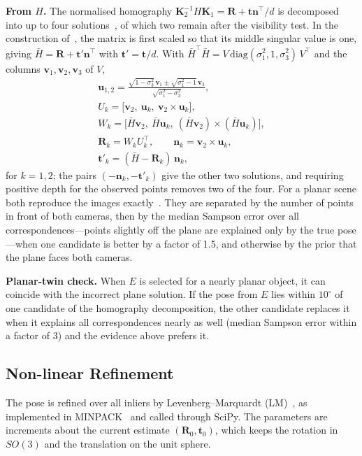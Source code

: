 \documentclass[10pt,a4paper,twocolumn]{article}
\newcommand{\R}{\mathbf{R}}
\newcommand{\tv}{\mathbf{t}}
\newcommand{\K}{\mathbf{K}}
\newcommand{\n}{\mathbf{n}}
\begin{document}
\textbf{From $H$.} The normalised homography $\K_2^{-1}H\K_1=\R+\tv\n^\top/d$ is decomposed into up to four solutions~\cite{malis}, of which two remain after the visibility test. In the construction of~\cite{ma2004}, the matrix is first scaled so that its middle singular value is one, giving $\bar H=\R+\tv'\n^\top$ with $\tv'=\tv/d$. With $\bar H^\top\bar H=V\,\mathrm{diag}(\sigma_1^2,1,\sigma_3^2)\,V^\top$ and the columns $\mathbf{v}_1,\mathbf{v}_2,\mathbf{v}_3$ of $V$,
\begin{gather}
  \mathbf{u}_{1,2}=\frac{\sqrt{1-\sigma_3^2}\,\mathbf{v}_1\pm\sqrt{\sigma_1^2-1}\,\mathbf{v}_3}{\sqrt{\sigma_1^2-\sigma_3^2}},\\
  U_k=\big[\mathbf{v}_2,\ \mathbf{u}_k,\ \mathbf{v}_2\times\mathbf{u}_k\big],\\
  W_k=\big[\bar H\mathbf{v}_2,\ \bar H\mathbf{u}_k,\ (\bar H\mathbf{v}_2)\times(\bar H\mathbf{u}_k)\big],\\
  \R_k=W_kU_k^\top,\qquad \n_k=\mathbf{v}_2\times\mathbf{u}_k,\\
  \tv'_k=(\bar H-\R_k)\,\n_k ,
\end{gather}
for $k=1,2$; the pairs $(-\n_k,-\tv'_k)$ give the other two solutions, and requiring positive depth for the observed points removes two of the four. For a planar scene both reproduce the images exactly~\cite{faugeras}. They are separated by the number of points in front of both cameras, then by the median Sampson error over all correspondences---points slightly off the plane are explained only by the true pose---when one candidate is better by a factor of 1.5, and otherwise by the prior that the plane faces both cameras.

\textbf{Planar-twin check.} When $E$ is selected for a nearly planar object, it can coincide with the incorrect plane solution. If the pose from $E$ lies within $10^\circ$ of one candidate of the homography decomposition, the other candidate replaces it when it explains all correspondences nearly as well (median Sampson error within a factor of 3) and the evidence above prefers it.

\subsection*{Non-linear Refinement}
The pose is refined over all inliers by Levenberg--Marquardt (LM)~\cite{levenberg,marquardt}, as implemented in MINPACK~\cite{more1978} and called through SciPy. The parameters are increments about the current estimate $(\R_0,\tv_0)$, which keeps the rotation in $SO(3)$ and the translation on the unit sphere.
\end{document}
